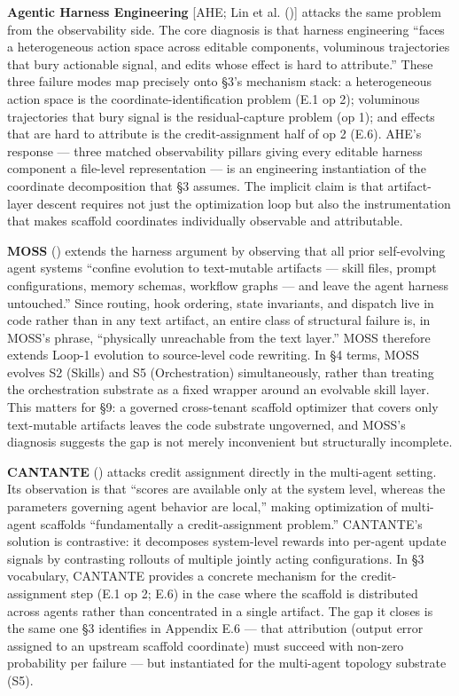 \documentclass[
]{article}
\begin{document}
\textbf{Agentic Harness Engineering} {[}AHE; Lin et al.
(){]} attacks the same problem from the
observability side. The core diagnosis is that harness engineering
``faces a heterogeneous action space across editable components,
voluminous trajectories that bury actionable signal, and edits whose
effect is hard to attribute.'' These three failure modes map precisely
onto §3's mechanism stack: a heterogeneous action space is the
coordinate-identification problem (E.1 op 2); voluminous trajectories
that bury signal is the residual-capture problem (op 1); and effects
that are hard to attribute is the credit-assignment half of op 2 (E.6).
AHE's response --- three matched observability pillars giving every
editable harness component a file-level representation --- is an
engineering instantiation of the coordinate decomposition that §3
assumes. The implicit claim is that artifact-layer descent requires not
just the optimization loop but also the instrumentation that makes
scaffold coordinates individually observable and attributable.

\textbf{MOSS} () extends the
harness argument by observing that all prior self-evolving agent systems
``confine evolution to text-mutable artifacts --- skill files, prompt
configurations, memory schemas, workflow graphs --- and leave the agent
harness untouched.'' Since routing, hook ordering, state invariants, and
dispatch live in code rather than in any text artifact, an entire class
of structural failure is, in MOSS's phrase, ``physically unreachable
from the text layer.'' MOSS therefore extends Loop-1 evolution to
source-level code rewriting. In §4 terms, MOSS evolves S2 (Skills) and
S5 (Orchestration) simultaneously, rather than treating the
orchestration substrate as a fixed wrapper around an evolvable skill
layer. This matters for §9: a governed cross-tenant scaffold optimizer
that covers only text-mutable artifacts leaves the code substrate
ungoverned, and MOSS's diagnosis suggests the gap is not merely
inconvenient but structurally incomplete.

\textbf{CANTANTE} () attacks
credit assignment directly in the multi-agent setting. Its observation
is that ``scores are available only at the system level, whereas the
parameters governing agent behavior are local,'' making optimization of
multi-agent scaffolds ``fundamentally a credit-assignment problem.''
CANTANTE's solution is contrastive: it decomposes system-level rewards
into per-agent update signals by contrasting rollouts of multiple
jointly acting configurations. In §3 vocabulary, CANTANTE provides a
concrete mechanism for the credit-assignment step (E.1 op 2; E.6) in the
case where the scaffold is distributed across agents rather than
concentrated in a single artifact. The gap it closes is the same one §3
identifies in Appendix E.6 --- that attribution (output error assigned
to an upstream scaffold coordinate) must succeed with non-zero
probability per failure --- but instantiated for the multi-agent
topology substrate (S5).
\end{document}
